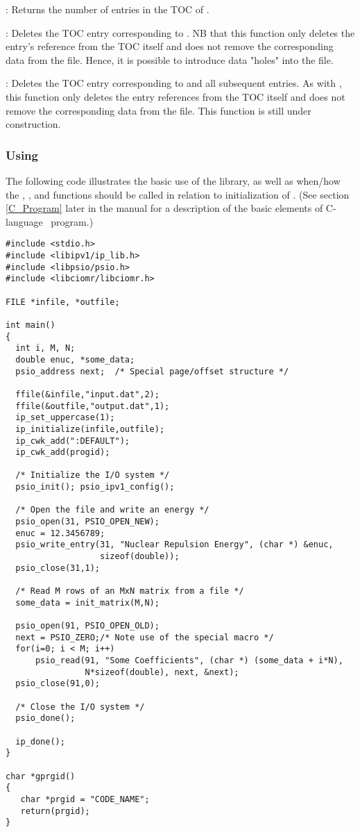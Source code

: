 : Returns the number
of entries in the TOC of .

: Deletes the TOC entry
corresponding to . NB that this function only deletes the
entry's reference from the TOC itself and does not remove the
corresponding data from the file. Hence, it is possible to introduce
data "holes" into the file.

: Deletes the TOC entry
corresponding to  and all subsequent entries. As with
, this function only deletes the entry
references from the TOC itself and does not remove the corresponding
data from the file. This function is still under construction.

\subsubsection{Using }
The following code illustrates the basic use of the library, as well
as when/how the , , and 
functions should be called in relation to initialization of
.  (See section \ref{C_Program} later in the manual
for a description of the basic elements of C-language \PSIthree\
program.)
\begin{verbatim}
#include <stdio.h>
#include <libipv1/ip_lib.h>
#include <libpsio/psio.h>
#include <libciomr/libciomr.h>

FILE *infile, *outfile;

int main()
{
  int i, M, N;
  double enuc, *some_data;
  psio_address next;  /* Special page/offset structure */

  ffile(&infile,"input.dat",2);
  ffile(&outfile,"output.dat",1);
  ip_set_uppercase(1);
  ip_initialize(infile,outfile);
  ip_cwk_add(":DEFAULT");
  ip_cwk_add(progid);

  /* Initialize the I/O system */
  psio_init(); psio_ipv1_config();

  /* Open the file and write an energy */
  psio_open(31, PSIO_OPEN_NEW);
  enuc = 12.3456789;
  psio_write_entry(31, "Nuclear Repulsion Energy", (char *) &enuc,
                   sizeof(double));
  psio_close(31,1);

  /* Read M rows of an MxN matrix from a file */
  some_data = init_matrix(M,N);

  psio_open(91, PSIO_OPEN_OLD);
  next = PSIO_ZERO;/* Note use of the special macro */
  for(i=0; i < M; i++)
      psio_read(91, "Some Coefficients", (char *) (some_data + i*N),
                N*sizeof(double), next, &next);
  psio_close(91,0);

  /* Close the I/O system */
  psio_done();

  ip_done();
}

char *gprgid()
{
   char *prgid = "CODE_NAME";
   return(prgid);
}
\end{verbatim}

